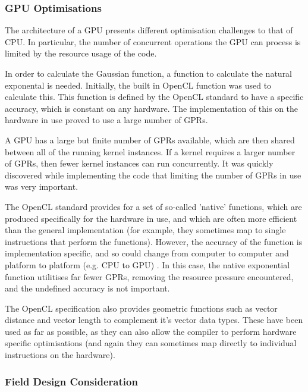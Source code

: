 \documentclass[10pt]{article}
\begin{document}
\subsubsection{\ac{GPU} Optimisations}

The architecture of a \ac{GPU} presents different optimisation challenges to
that of \ac{CPU}. In particular, the number of concurrent operations the
\ac{GPU} can process is limited by the resource usage of the code.

In order to calculate the Gaussian function, a function to calculate the natural
exponental is needed. Initially, the built in OpenCL function was used to
calculate this. This function is defined by the OpenCL standard to have a
specific accuracy, which is constant on any hardware. The implementation of this
on the hardware in use proved to use a large number of \acp{GPR}.

A \ac{GPU} has a large but finite number of \acp{GPR} available, which are then
shared between all of the running kernel instances. If a kernel requires a
larger number of \acp{GPR}, then fewer kernel instances can run concurrently. It
was quickly discovered while implementing the code that limiting the number of
\acp{GPR} in use was very important.

The OpenCL standard provides for a set of so-called 'native' functions, which
are produced specifically for the hardware in use, and which are often more
efficient than the general implementation (for example, they sometimes map to
single instructions that perform the functions). However, the accuracy of the
function is implementation specific, and so could change from computer to
computer and platform to platform (e.g. \ac{CPU} to \ac{GPU})
\cite{openCl11Spec}. In this case, the native exponential function utilitises
far fewer \acp{GPR}, removing the resource pressure encountered, and the
undefined accuracy is not important.

The OpenCL specification also provides geometric functions such as vector
distance and vector length to complement it's vector data types. These have been
used as far as possible, as they can also allow the compiler to perform hardware
specific optimisations (and again they can sometimes map directly to individual
instructions on the hardware).\cite{openCl11Spec}

\subsubsection{Field Design Consideration\label{sub:fieldDesignConsiderations}}
\end{document}
